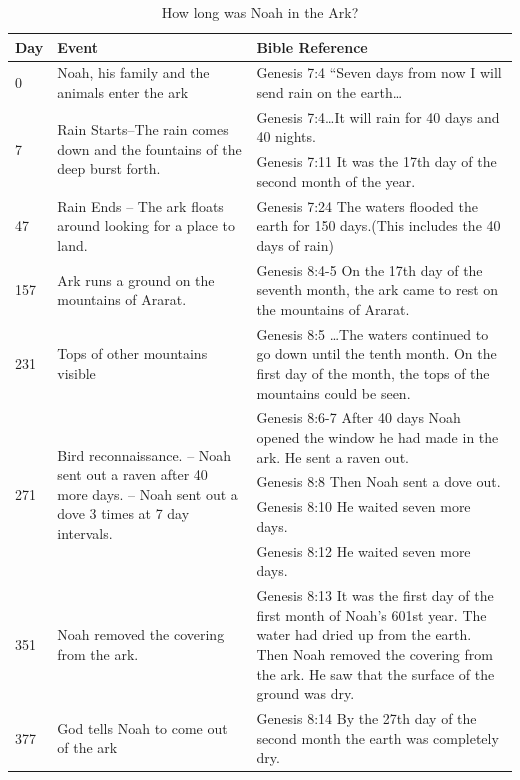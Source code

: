 \begin{table}[h!]
  \begin{center}
    \caption{How long was Noah in the Ark?}
    \label{tab:table1}
\begin{tabular}{p{.5cm}|p{5.95cm}|p{10.5cm}}\hline\hline
      \textbf{Day} & \textbf{Event	} & \textbf{Bible Reference}\\\hline
      0 & Noah, his family and the animals enter the ark&Genesis 7:4 “Seven days from now I will send rain on the earth…\\\hline
      \multirow{2}{.5cm}{7} &\multirow{2}{5.95cm}{Rain Starts–The rain comes down and the fountains of the deep burst forth.}&Genesis 7:4…It will rain for 40 days and 40 nights.\\\cline{3-3}
&&Genesis 7:11 It was the 17th day of the second month of the year.\\\hline
      47 &Rain Ends – The ark floats around looking for a place to land.&Genesis 7:24 The waters flooded the earth for 150 days.(This includes the 40 days of rain)\\\hline
157 &Ark runs a ground on the mountains of Ararat.&Genesis 8:4-5 On the 17th day of the seventh month, the ark came to rest on the mountains of Ararat.\\\hline
231 &Tops of other mountains visible&Genesis 8:5 …The waters continued to go down until the tenth month. On the first day of the month, the tops of the mountains could be seen.\\\hline
 \multirow{4}{.5cm}{271}& \multirow{4}{5.95cm}{Bird reconnaissance. – Noah sent out a raven after 40 more days. – Noah sent out a dove 3 times at 7 day intervals.}&Genesis 8:6-7 After 40 days Noah opened the window he had made in the ark.  He sent a raven out.\\\cline{3-3}
&&Genesis 8:8 Then Noah sent a dove out.\\\cline{3-3}
&&Genesis 8:10 He waited seven more days.\\\cline{3-3}
&&Genesis 8:12 He waited seven more days.\\\hline
351&Noah removed the covering from the ark. &Genesis 8:13 It was the first day of the first month of Noah’s 601st year. The water had dried up from the earth. Then Noah removed the covering from the ark. He saw that the surface of the ground was dry.\\\hline
377&God tells Noah to come out of the ark&Genesis 8:14 By the 27th day of the second month the earth was completely dry.\\\hline
    \end{tabular}
  \end{center}
\end{table}

